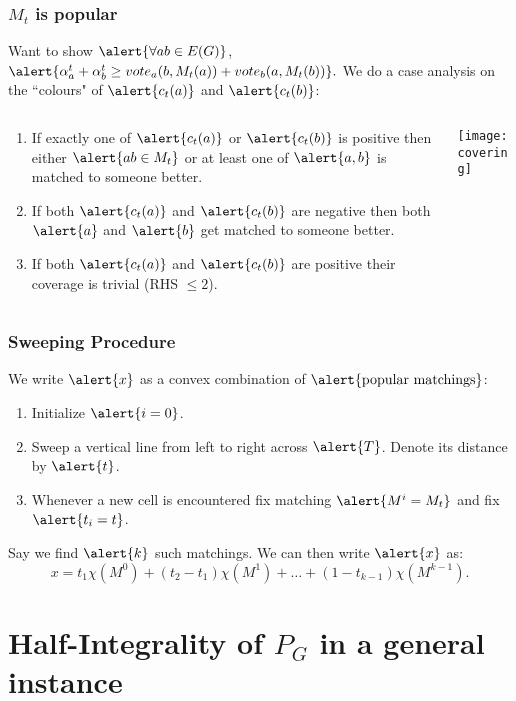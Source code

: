 \documentclass[10pt]{beamer}
\begin{document}
\begin{frame}
\frametitle{$M_t$ is popular}
Want to show $\alert{\forall ab \in E(G)}$, $\alert{\alpha^t_a + \alpha^t_b \geq vote_a(b,M_t(a)) + vote_b(a, M_t(b))}.$
We do a case analysis on the ``colours" of $\alert{c_t(a)}$ and $\alert{c_t(b)}$:
\begin{columns}[T] %
\begin{column}{.48\textwidth}
\begin{enumerate}
\item If exactly one of $\alert{c_t(a)}$ or $\alert{c_t(b)}$ is positive then either $\alert{ab \in M_t}$ or at least one of $\alert{a,b}$ is matched to someone better.
\item If both $\alert{c_t(a)}$ and $\alert{c_t(b)}$ are negative then both $\alert{a}$ and $\alert{b}$ get matched to someone better.
\item If both $\alert{c_t(a)}$ and $\alert{c_t(b)}$ are positive their coverage is trivial (RHS $\leq 2$).
\end{enumerate}
\end{column}
\begin{column}{.48\textwidth}
\texttt{[image: covering]}
\end{column}
\end{columns}
\end{frame}

\begin{frame}
\frametitle{Sweeping Procedure}
We write $\alert{x}$ as a convex combination of $\text{\alert{popular matchings}}$:
\begin{enumerate}
\item Initialize $\alert{i=0}$.
\item Sweep a vertical line from left to right across $\alert{T}$. Denote its distance by $\alert{t}$. 
\item Whenever a new cell is encountered fix matching $\alert{M^i = M_t}$ and fix $\alert{t_i = t}$. 
\end{enumerate}
Say we find $\alert{k}$ such matchings. We can then write $\alert{x}$ as:
$$x = t_1\chi(M^0) + (t_2 - t_1)\chi(M^1) + \dots + (1 - t_{k-1}) \chi(M^{k-1}).$$
\end{frame}
\section{Half-Integrality of $P_G$ in a general instance}
\end{document}
